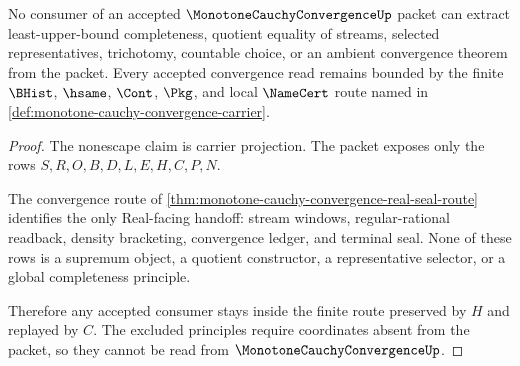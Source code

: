 \begin{theorem}
\label{thm:monotone-cauchy-convergence-nonescape}
No consumer of an accepted $\MonotoneCauchyConvergenceUp$ packet can extract least-upper-bound completeness, quotient equality of streams, selected representatives, trichotomy, countable choice, or an ambient convergence theorem from the packet. Every accepted convergence read remains bounded by the finite $\BHist$, $\hsame$, $\Cont$, $\Pkg$, and local $\NameCert$ route named in \autoref{def:monotone-cauchy-convergence-carrier}.
\end{theorem}
\begin{proof}
The nonescape claim is carrier projection. The packet exposes only the rows $S,R,O,B,D,L,E,H,C,P,N$.

The convergence route of \autoref{thm:monotone-cauchy-convergence-real-seal-route} identifies the only Real-facing handoff: stream windows, regular-rational readback, density bracketing, convergence ledger, and terminal seal. None of these rows is a supremum object, a quotient constructor, a representative selector, or a global completeness principle.

Therefore any accepted consumer stays inside the finite route preserved by $H$ and replayed by $C$. The excluded principles require coordinates absent from the packet, so they cannot be read from $\MonotoneCauchyConvergenceUp$.
\end{proof}



